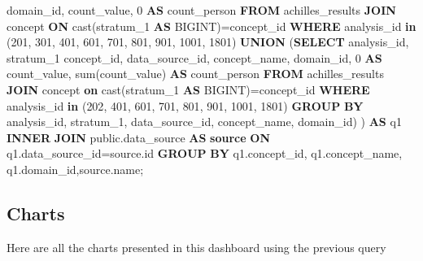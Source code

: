 \documentclass[]{book}
\newenvironment{Shaded}{\begin{snugshade}}{\end{snugshade}}
\newcommand{\KeywordTok}[1]{\textcolor[rgb]{0.13,0.29,0.53}{\textbf{#1}}}
\newcommand{\DecValTok}[1]{\textcolor[rgb]{0.00,0.00,0.81}{#1}}
\newcommand{\FunctionTok}[1]{\textcolor[rgb]{0.00,0.00,0.00}{#1}}
\newcommand{\NormalTok}[1]{#1}
\begin{document}
\begin{Shaded}
\begin{Highlighting}[]
\NormalTok{             domain_id,}
\NormalTok{             count_value, }\DecValTok{0} \KeywordTok{AS}\NormalTok{ count_person}
    \KeywordTok{FROM}\NormalTok{ achilles_results}
    \KeywordTok{JOIN}\NormalTok{ concept }\KeywordTok{ON} \FunctionTok{cast}\NormalTok{(stratum_1 }\KeywordTok{AS}\NormalTok{ BIGINT)=concept_id}
    \KeywordTok{WHERE}\NormalTok{ analysis_id }\KeywordTok{in}\NormalTok{ (}\DecValTok{201}\NormalTok{, }\DecValTok{301}\NormalTok{, }\DecValTok{401}\NormalTok{, }\DecValTok{601}\NormalTok{, }\DecValTok{701}\NormalTok{, }\DecValTok{801}\NormalTok{, }\DecValTok{901}\NormalTok{, }\DecValTok{1001}\NormalTok{, }
        \DecValTok{1801}\NormalTok{)}
    \KeywordTok{UNION}\NormalTok{ (}\KeywordTok{SELECT}\NormalTok{  analysis_id,}
\NormalTok{                   stratum_1 concept_id,}
\NormalTok{                   data_source_id,}
\NormalTok{                   concept_name,}
\NormalTok{                   domain_id,}
                   \DecValTok{0} \KeywordTok{AS}\NormalTok{ count_value,}
                   \FunctionTok{sum}\NormalTok{(count_value) }\KeywordTok{AS}\NormalTok{ count_person}
            \KeywordTok{FROM}\NormalTok{  achilles_results}
            \KeywordTok{JOIN}\NormalTok{ concept }\KeywordTok{on} \FunctionTok{cast}\NormalTok{(stratum_1 }\KeywordTok{AS}\NormalTok{ BIGINT)=concept_id}
            \KeywordTok{WHERE}\NormalTok{ analysis_id }\KeywordTok{in}\NormalTok{ (}\DecValTok{202}\NormalTok{, }\DecValTok{401}\NormalTok{, }\DecValTok{601}\NormalTok{, }\DecValTok{701}\NormalTok{, }\DecValTok{801}\NormalTok{, }\DecValTok{901}\NormalTok{, }
                \DecValTok{1001}\NormalTok{, }\DecValTok{1801}\NormalTok{)}
            \KeywordTok{GROUP} \KeywordTok{BY}\NormalTok{ analysis_id, stratum_1, data_source_id, }
\NormalTok{                concept_name, domain_id) ) }\KeywordTok{AS}\NormalTok{ q1}
    \KeywordTok{INNER} \KeywordTok{JOIN}\NormalTok{ public.data_source }\KeywordTok{AS} \KeywordTok{source} \KeywordTok{ON}\NormalTok{ q1.data_source_id=source.id}
\KeywordTok{GROUP} \KeywordTok{BY}\NormalTok{ q1.concept_id, q1.concept_name, q1.domain_id,source.name;}
\end{Highlighting}
\end{Shaded}

\subsection{Charts}\label{charts}

Here are all the charts presented in this dashboard using the previous
query
\end{document}
